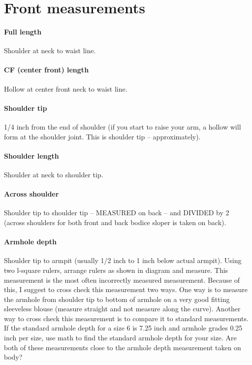 \documentclass{article}
\begin{document}
\section{Front measurements}

\paragraph{Full length}
Shoulder at neck to waist line.

\paragraph{CF (center front) length}
Hollow at center front neck to waist line.

\paragraph{Shoulder tip}
1/4 inch from the end of shoulder (if you start to raise your arm, a hollow will form at the shoulder joint. This is shoulder tip – approximately).

\paragraph{Shoulder length}
Shoulder at neck to shoulder tip.

\paragraph{Across shoulder}
Shoulder tip to shoulder tip – MEASURED on back – and DIVIDED by 2 (across shoulders for both front and back bodice sloper is taken on back).

\paragraph{Armhole depth}
Shoulder tip to armpit (usually 1/2 inch to 1 inch below actual armpit). Using two l-square rulers, arrange rulers as shown in diagram and measure. This measurement is the most often incorrectly measured measurement. Because of this, I suggest to cross check this measurement two ways. One way is to measure the armhole from shoulder tip to bottom of armhole on a very good fitting sleeveless blouse (measure straight and not measure along the curve). Another way to cross check this measurement is to compare it to standard measurements. If the standard armhole depth for a size 6 is 7.25 inch and armhole grades 0.25 inch per size, use math to find the standard armhole depth for your size. Are both of these measurements close to the armhole depth measurement taken on body?
\end{document}
